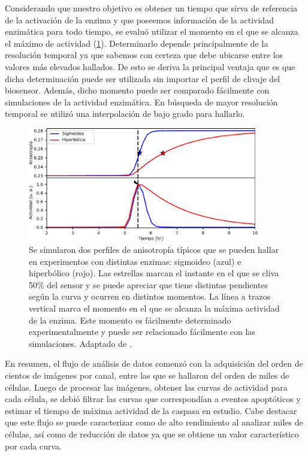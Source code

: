 Considerando que nuestro objetivo es obtener un tiempo que sirva de referencia de la activación de la enzima y que poseemos información de la actividad enzimática para todo tiempo, se evaluó utilizar el momento en el que se alcanza el máximo de actividad (\cref{fig:curvas_tipicas}). Determinarlo depende principalmente de la resolución temporal ya que sabemos con certeza que debe ubicarse entre los valores más elevados hallados. De esto se deriva la principal ventaja que es que dicha determinación puede ser utilizada sin importar el perfil de clivaje del biosensor. Además, dicho momento puede ser comparado fácilmente con simulaciones de la actividad enzimática. En búsqueda de mayor resolución temporal se utilizó una interpolación de bajo grado para hallarlo.

\begin{figure}[t!]
    \centering
    \includegraphics[width=0.9\textwidth]{img/cap_2/sim_analysis.pdf}
    \caption{\footnotesize{Se simularon dos perfiles de anisotropía típicos que se pueden hallar en experimentos con distintas enzimas: sigmoideo (azul) e hiperbólico (rojo). Las estrellas marcan el instante en el que se cliva 50\% del sensor y se puede apreciar que tiene distintas pendientes según la curva y ocurren en distintos momentos. La línea a trazos vertical marca el momento en el que se alcanza la máxima actividad de la enzima. Este momento es fácilmente determinado experimentalmente y puede ser relacionado fácilmente con las simulaciones. Adaptado de \cite{Corbat2018}.}}
    \label{fig:curvas_tipicas}
\end{figure}

En resumen, el flujo de análisis de datos comenzó con la adquisición del orden de cientos de imágenes por canal, entre las que se hallaron del orden de miles de células. Luego de procesar las imágenes, obtener las curvas de actividad para cada célula, se debió filtrar las curvas que correspondían a eventos apoptóticos y estimar el tiempo de máxima actividad de la caspasa en estudio. Cabe destacar que este flujo se puede caracterizar como de alto rendimiento al analizar miles de células, así como de reducción de datos ya que se obtiene un valor característico por cada curva.